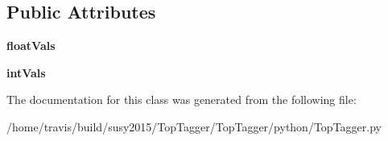 \subsection*{Public Attributes}
\begin{DoxyCompactItemize}
\item 
\hypertarget{classTopTagger_1_1TopTaggerResult_a3e180987b6abcfe7cc7c40b199f0c386}{{\bfseries float\-Vals}}\label{classTopTagger_1_1TopTaggerResult_a3e180987b6abcfe7cc7c40b199f0c386}

\item 
\hypertarget{classTopTagger_1_1TopTaggerResult_a6cf9e0d32998c8ac16efaaa4ae32c2ad}{{\bfseries int\-Vals}}\label{classTopTagger_1_1TopTaggerResult_a6cf9e0d32998c8ac16efaaa4ae32c2ad}

\end{DoxyCompactItemize}


The documentation for this class was generated from the following file\-:\begin{DoxyCompactItemize}
\item 
/home/travis/build/susy2015/\-Top\-Tagger/\-Top\-Tagger/python/Top\-Tagger.\-py\end{DoxyCompactItemize}
